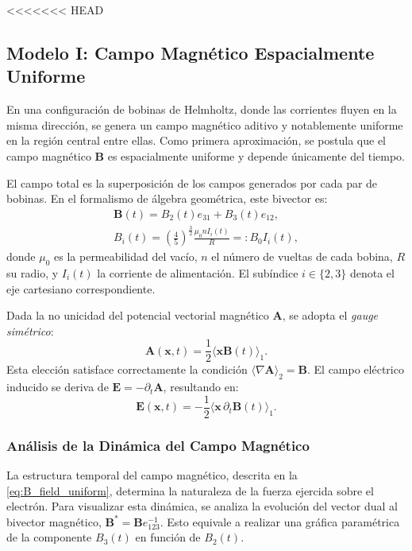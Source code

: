 <<<<<<< HEAD
\subsection{Modelo I: Campo Magnético Espacialmente Uniforme}
\label{ssec:campo_uniforme}

En una configuración de bobinas de Helmholtz, donde las corrientes fluyen
en la misma dirección, se genera un campo magnético aditivo y
notablemente uniforme en la región central entre ellas. Como primera
aproximación, se postula que el campo magnético $\boldsymbol{B}$ es
espacialmente uniforme y depende únicamente del tiempo.

El campo total es la superposición de los campos generados por cada par
de bobinas. En el formalismo de álgebra geométrica, este bivector es:
\begin{gather}
	\boldsymbol{B}(t) = B_2(t) e_{31} + B_3(t) e_{12},
	\label{eq:B_field_uniform}
	\\
	B_i(t) = \left( \frac{4}{5} \right)^{\frac{3}{2}}
	\frac{\mu_0 n I_{i}(t)}{R} =: B_0 I_i(t),
	\label{eq:B_field_magnitude}
\end{gather}
%
donde $\mu_0$ es la permeabilidad del vacío, $n$ el número de vueltas de
cada bobina, $R$ su radio, y $I_i(t)$ la corriente de alimentación. El
subíndice $i \in \{2, 3\}$ denota el eje cartesiano correspondiente.

Dada la no unicidad del potencial vectorial magnético $\boldsymbol{A}$, se
adopta el \emph{gauge simétrico}:
%
\begin{equation}
	\boldsymbol{A}(\boldsymbol{x}, t) = \frac{1}{2}
	\langle \boldsymbol{x} \boldsymbol{B}(t) \rangle_{1}.
	\label{eq:symmetric_gauge}
\end{equation}
%
Esta elección satisface correctamente la condición
$\langle \nabla \boldsymbol{A} \rangle_{2} = \boldsymbol{B}$.
El campo eléctrico inducido se deriva de
$\boldsymbol{E} = - \partial_t \boldsymbol{A}$, resultando en:
%
\begin{equation}
	\boldsymbol{E}(\boldsymbol{x}, t) = - \frac{1}{2} \langle \boldsymbol{x}
	\, \partial_t \boldsymbol{B}(t) \rangle_{1}.
	\label{eq:E_induced_uniform}
\end{equation}

\subsubsection{Análisis de la Dinámica del Campo Magnético}
\label{sssec:dinamica_b}

La estructura temporal del campo magnético, descrita en la
\cref{eq:B_field_uniform}, determina la naturaleza de la fuerza ejercida
sobre el electrón. Para visualizar esta dinámica, se analiza la
evolución del vector dual al bivector magnético,
$\boldsymbol{B}^* = \boldsymbol{B}e_{123}^{-1}$. Esto equivale a realizar
una gráfica paramétrica de la componente $B_3(t)$ en función de $B_2(t)$.

